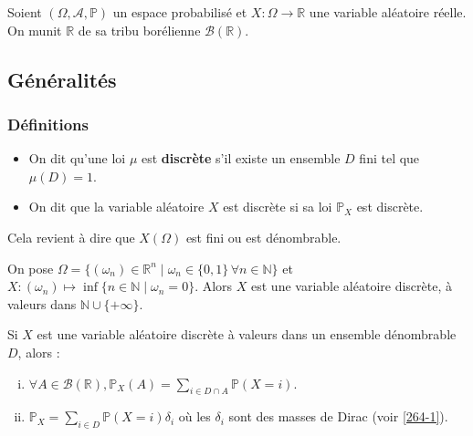 




	Soient $(\Omega, \mathcal{A}, \mathbb{P})$ un espace probabilisé et $X : \Omega \rightarrow \mathbb{R}$ une variable aléatoire réelle. On munit $\mathbb{R}$ de sa tribu borélienne $\mathcal{B}(\mathbb{R})$.

	\subsection{Généralités}

	\subsubsection{Définitions}


	\begin{definition}
		\begin{itemize}
			\item On dit qu'une loi $\mu$ est \textbf{discrète} s'il existe un ensemble $D$ fini tel que $\mu(D) = 1$.
			\item On dit que la variable aléatoire $X$ est discrète si sa loi $\mathbb{P}_X$ est discrète.
		\end{itemize}
	\end{definition}
	
	
	\begin{remark}
		Cela revient à dire que $X(\Omega)$ est fini ou est dénombrable.
	\end{remark}
	
	\begin{example}
		On pose $\Omega = \{ (\omega_n) \in \mathbb{R}^n \mid \omega_n \in \{ 0,1 \} \, \forall n \in \mathbb{N} \}$ et $X : (\omega_n) \mapsto \inf \{ n \in \mathbb{N} \mid \omega_n = 0 \}$. Alors $X$ est une variable aléatoire discrète, à valeurs dans $\mathbb{N} \cup \{ +\infty \}$.
	\end{example}


	\begin{proposition}
		Si $X$ est une variable aléatoire discrète à valeurs dans un ensemble dénombrable $D$, alors :
		\begin{enumerate}[(i)]
			\item $\forall A \in \mathcal{B}(\mathbb{R}), \mathbb{P}_X(A) = \sum_{i \in D \cap A} \mathbb{P}(X=i)$.
			\item $\mathbb{P}_X = \sum_{i \in D} \mathbb{P}(X=i) \delta_i$ où les $\delta_i$ sont des masses de Dirac (voir \cref{264-1}).
		\end{enumerate}
	\end{proposition}


